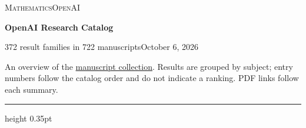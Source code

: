 \documentclass[11pt,a4paper]{article}
\begin{document}
\thispagestyle{firstpage}
{\small\scshape Mathematics\hfill OpenAI\par}
\vspace{5pt}
{\LARGE\bfseries OpenAI Research Catalog\par}
\vspace{4pt}
{\small 372 result families in 722 manuscripts\hfill October 6, 2026\par}
\vspace{7pt}
{\small An overview of the \href{https://github.com/openai/math}{manuscript collection}. Results are grouped by subject; entry numbers follow the catalog order and do not indicate a ranking. PDF links follow each summary.\par}
\vspace{8pt}\hrule height 0.35pt\vspace{5pt}
\end{document}
